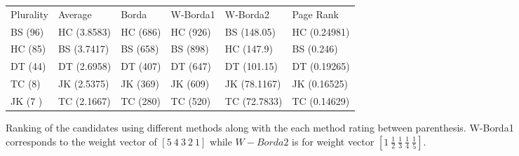 \begin{figure}[tbh]
 \centering    
\begin{tabular}{ |p{2cm}|p{2.5cm}|p{3cm}|p{2cm}|p{2.5cm}|p{2.5cm}|}
 \hline
  Plurality & Average &  Borda & W-Borda1 & W-Borda2 & Page Rank \\ \hhline{|=|=|=|=|=|=|}
 \hline
   BS (96) & HC (3.8583) & HC (686) & HC (926) & BS (148.05) & HC (0.24981) \\
   HC (85) & BS (3.7417) & BS (658) & BS (898) & HC (147.9)  & BS (0.246)   \\
   DT (44) & DT (2.6958) & DT (407) & DT (647) & DT (101.15) & DT (0.19265) \\
   TC (8)  & JK (2.5375) & JK (369) & JK (609) & JK (78.1167)& JK (0.16525) \\
   JK (7 ) & TC (2.1667) & TC (280) & TC (520) & TC (72.7833)& TC (0.14629) \\ 
 \hline
\end{tabular}
\caption{Ranking of the candidates using different methods along with the each method rating between parenthesis. W-Borda1 corresponds to the weight vector of $[5\ 4\ 3\ 2\ 1]$ while $W-Borda2$ is for weight vector  $[1\ \frac{1}{2}\ \frac{1}{3}\ \frac{1}{4}\ \frac{1}{5}]$.} 
\end{figure} 
    
    
    
    
    
    
    
    
    
    
    
    
    
    
    
    
    
    
    
    
    